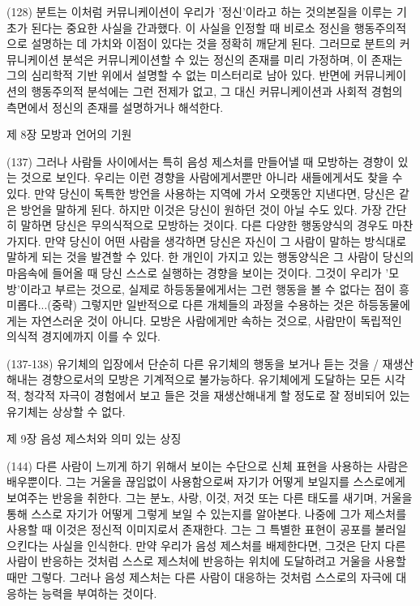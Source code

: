 \documentclass[12pt, a4paper]{article}
\begin{document}
(128) 분트는 이처럼 커뮤니케이션이 우리가 '정신'이라고 하는 것의본질을 이루는 기초가 된다는 중요한 사실을 간과했다. 이 사실을 인정할 때 비로소 정신을 행동주의적으로 설명하는 데 가치와 이점이 있다는 것을 정확히 깨닫게 된다. 그러므로 분트의 커뮤니케이션 분석은 커뮤니케이션할 수 있는 정신의 존재를 미리 가정하며, 이 존재는 그의 심리학적 기반 위에서 설명할 수 없는 미스터리로 남아 있다. 반면에 커뮤니케이션의 행동주의적 분석에는 그런 전제가 없고, 그 대신 커뮤니케이션과 사회적 경험의 측면에서 정신의 존재를 설명하거나 해석한다.

제 8장 모방과 언어의 기원

(137) 그러나 사람들 사이에서는 특히 음성 제스처를 만들어낼 때 모방하는 경향이 있는 것으로 보인다. 우리는 이런 경향을 사람에게서뿐만 아니라 새들에게서도 찾을 수 있다. 만약 당신이 독특한 방언을 사용하는 지역에 가서 오랫동안 지낸다면, 당신은 같은 방언을 말하게 된다. 하지만 이것은 당신이 원하던 것이 아닐 수도 있다. 가장 간단히 말하면 당신은 무의식적으로 모방하는 것이다. 다른 다양한 행동양식의 경우도 마찬가지다. 만약 당신이 어떤 사람을 생각하면 당신은 자신이 그 사람이 말하는 방식대로 말하게 되는 것을 발견할 수 있다. 한 개인이 가지고 있는 행동양식은 그 사람이 당신의 마음속에 들어올 때 당신 스스로 실행하는 경향을 보이는 것이다. 그것이 우리가 '모방'이라고 부르는 것으로, 실제로 하등동물에게서는 그런 행동을 볼 수 없다는 점이 흥미롭다...(중략) 그렇지만 일반적으로 다른 개체들의 과정을 수용하는 것은 하등동물에게는 자연스러운 것이 아니다. 모방은 사람에게만 속하는 것으로, 사람만이 독립적인 의식적 경지에까지 이를 수 있다.

(137-138) 유기체의 입장에서 단순히 다른 유기체의 행동을 보거나 듣는 것을 / 재생산해내는 경향으로서의 모방은 기계적으로 불가능하다. 유기체에게 도달하는 모든 시각적, 청각적 자극이 경험에서 보고 들은 것을 재생산해내게 할 정도로 잘 정비되어 있는 유기체는 상상할 수 없다.

제 9장 음성 제스처와 의미 있는 상징

(144) 다른 사람이 느끼게 하기 위해서 보이는 수단으로 신체 표현을 사용하는 사람은 배우뿐이다. 그는 거울을 끊임없이 사용함으로써 자기가 어떻게 보일지를 스스로에게 보여주는 반응을 취한다. 그는 분노, 사랑, 이것, 저것 또는 다른 태도를 새기며, 거울을 통해 스스로 자기가 어떻게 그렇게 보일 수 있는지를 알아본다. 나중에 그가 제스처를 사용할 때 이것은 정신적 이미지로서 존재한다. 그는 그 특별한 표현이 공포를 불러일으킨다는 사실을 인식한다. 만약 우리가 음성 제스처를 배제한다면, 그것은 단지 다른 사람이 반응하는 것처럼 스스로 제스처에 반응하는 위치에 도달하려고 거울을 사용할 때만 그렇다. 그러나 음성 제스처는 다른 사람이 대응하는 것처럼 스스로의 자극에 대응하는 능력을 부여하는 것이다. 
\end{document}
